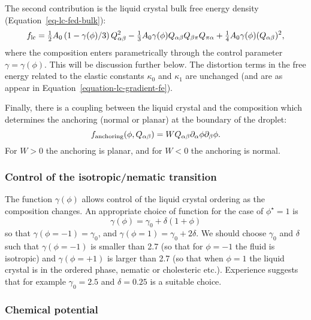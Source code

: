 The second contribution is the liquid crystal bulk free energy density
(Equation~\ref{eq-lc-fed-bulk}):
\begin{equation}
f_{\rm lc} =
  {\textstyle\frac{1}{2}}A_0 \left(1-\gamma(\phi)/3\right) Q_{\alpha\beta}^2
- {\textstyle\frac{1}{3}}A_0 \gamma(\phi)
  Q_{\alpha\beta} Q_{\beta\pi} Q_{\pi\alpha}
+ {\textstyle\frac{1}{4}} A_0 \gamma(\phi) (Q_{\alpha\beta})^2,
\end{equation}
where the composition enters parametrically through the control
parameter $\gamma = \gamma(\phi)$. This will be discussion further
below. The distortion terms in the
free energy related to the elastic constants $\kappa_0$ and $\kappa_1$
are unchanged (and are as appear in Equation~\ref{equation-lc-gradient-fe}).

Finally, there is a coupling between the liquid crystal and the
composition which determines the anchoring (normal or planar) at
the boundary of the droplet:
\begin{equation}
f_{\rm anchoring}(\phi,Q_{\alpha\beta}) =
W Q_{\alpha\beta}\partial_{\alpha}\phi\partial_{\beta}\phi.
\end{equation}
For $W>0$ the anchoring is planar, and for $W<0$ the anchoring is normal.

\subsubsection{Control of the isotropic/nematic transition}
The function $\gamma(\phi)$ allows control of the liquid crystal
ordering as the composition changes. An appropriate choice of function
for the case of $\phi^\star = 1$ is
\begin{equation}
\gamma(\phi)=\gamma_0+\delta\left(1+\phi\right)
\end{equation}
so that $\gamma(\phi=-1)=\gamma_0$, and $\gamma(\phi=1)=\gamma_0+2\delta$.
We should choose $\gamma_0$ and $\delta$ such that $\gamma(\phi=-1)$ 
is smaller than 2.7 (so that for $\phi=-1$ the fluid is isotropic)
and $\gamma(\phi=+1)$ is larger than 2.7 (so that when $\phi=1$ the
liquid crystal is in the ordered phase, nematic or cholesteric etc.).
Experience suggests that for example 
$\gamma_0=2.5$ and $\delta=0.25$ is a suitable choice.

\subsubsection{Chemical potential}

